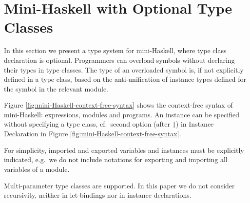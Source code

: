 \section{Mini-Haskell with Optional Type Classes}
\label{Optional-type-classes}

In this section we present a type system for mini-Haskell, where type
class declaration is optional. Programmers can overload symbols
without declaring their types in type classes. The type of an
overloaded symbol is, if not explicitly defined in a type class, based
on the anti-unification of instance types defined for the symbol in
the relevant module.

Figure \ref{fig:mini-Haskell-context-free-syntax} shows the
context-free syntax of mini-Haskell: expressions, modules and
programs.  An instance can be specified without specifying a type
class, cf.~second option (after {\tt |}) in Instance Declaration in
Figure \ref{fig:mini-Haskell-context-free-syntax}.



For simplicity, imported and exported variables and instances must be
explicitly indicated, e.g.~we do not include notations for exporting
and importing all variables of a module.

Multi-parameter type classes are supported. In this paper we do not
consider recursivity, neither in let-bindings nor in instance
declarations. \vspace{-.3cm} 

